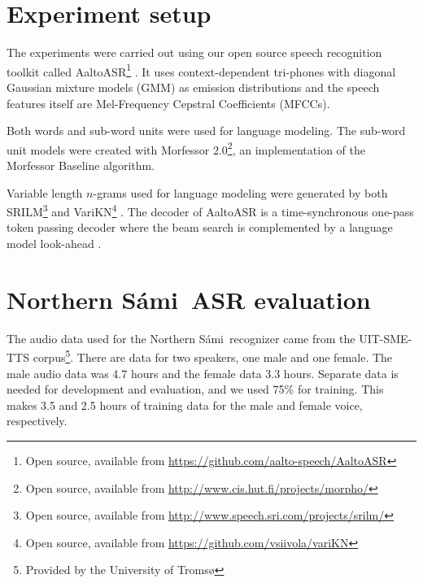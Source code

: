 \documentclass[b5paper]{article}
\newcommand{\note}[1]{{\textcolor{blue}{#1}}}
\newcommand{\ns}{Northern Sámi}
\newcommand{\ngram}{$n$-gram}
\begin{document}


\section{Experiment setup}



The experiments were carried out using our open source speech recognition toolkit called AaltoASR\footnote{Open source, available from \url{https://github.com/aalto-speech/AaltoASR}} \cite{hirsimaki2009importance}\cite{pylkkonen2005efficient}. It uses context-dependent tri-phones with diagonal Gaussian mixture models (GMM) as emission distributions and the speech features itself are Mel-Frequency Cepstral Coefficients (MFCCs). 

Both words and sub-word units were used for language modeling. The sub-word unit models were created with Morfessor 2.0\footnote{Open source, available from \url{http://www.cis.hut.fi/projects/morpho/}}, an implementation of the Morfessor Baseline algorithm\cite{virpioja2013morfessor}. 

Variable length \ngram s used for language modeling were generated by both SRILM\footnote{Open source, available from \url{http://www.speech.sri.com/projects/srilm/}} \cite{stolcke2002srilm} and VariKN\footnote{Open source, available from \url{https://github.com/vsiivola/variKN}} \cite{siivola2007growing,siivola2007morfessor}. The decoder of AaltoASR is a time-synchronous one-pass token passing decoder where the beam search is complemented by a language model look-ahead \cite{ortmanns1997look}.




\section{\ns\ ASR evaluation} 
\label{sec:samiexp}
The audio data used for the \ns\ recognizer came from the UIT-SME-TTS corpus\footnote{Provided by the University of Tromsø}. There are data for two speakers, one male and one female. The male audio data was 4.7 hours and the female data 3.3 hours. Separate data is needed for development and evaluation, and we used 75\% for training. This makes 3.5 and 2.5 hours of training data for the male and female voice, respectively.
\end{document}
